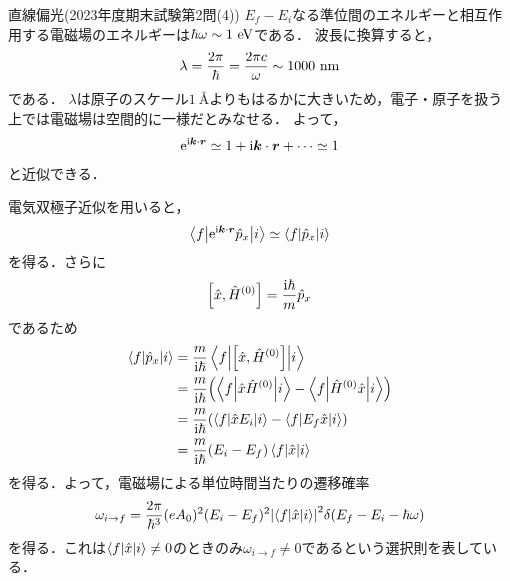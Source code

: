 \documentclass{report}
\begin{document}
\begin{myex}{直線偏光(2023年度期末試験第2問(4))}{}
    $E_f - E_i$なる準位間のエネルギーと相互作用する電磁場のエネルギーは$\hbar \omega\sim 1\ \mathrm{eV}$である．
    波長に換算すると，
    \begin{align}
      \lambda = \frac{2\pi}{\hbar} = \frac{2\pi c}{\omega} \sim 1000\ \r{nm}
    \end{align}
    である．
    $\lambda$は原子のスケール$1\ \si{\angstrom}$よりもはるかに大きいため，電子・原子を扱う上では電磁場は空間的に一様だとみなせる．
    よって，
    \begin{align}
      \mathrm{e}^{\mathrm{i}\bm{k}\cdot\bm{r}}\simeq 1 + \mathrm{i} \bm{k} \cdot \bm{r} + \cdots \simeq 1
    \end{align}
    と近似できる．
    \par
    電気双極子近似を用いると，
    \begin{align}
      \mel**{f}{\mathrm{e}^{\mathrm{i} \bm{k} \cdot \bm{r}}\hat{p}_x}{{i}} \simeq \mel**{f}{\hat{p}_x}{i}
    \end{align}
    を得る．さらに
    \begin{align}
      \qty[\hat{x}, \hat{H}^{(0)}] = \frac{\mathrm{i} \hbar}{m}\hat{p}_x
    \end{align}
    であるため
    \begin{align}
      \mel**{f}{\hat{p}_x}{i} &= \frac{m}{\mathrm{i}\hbar} \mel**{f}{\qty[\hat{x}, \hat{H}^{(0)}]}{i} \\ 
      &= \frac{m}{\mathrm{i}\hbar} \qty(\mel**{f}{\hat{x}\hat{H}^{(0)}}{i} - \mel**{f}{\hat{H}^{(0)}\hat{x}}{i}) \\ 
      &= \frac{m}{\mathrm{i}\hbar} \qty(\mel**{f}{\hat{x}E_i}{i} - \mel**{f}{E_f\hat{x}}{i}) \\ 
      &= \frac{m}{\mathrm{i}\hbar} (E_i - E_f)\mel**{f}{\hat{x}}{i}
    \end{align}
    を得る．よって，電磁場による単位時間当たりの遷移確率
    \begin{align}
      \omega_{i \to f} = \frac{2\pi}{\hbar^3} (eA_0)^2 (E_i - E_f)^2 \abs{\mel**{f}{\hat{x}}{i}}^2 \delta(E_f - E_i - \hbar\omega) 
    \end{align}
    を得る．これは$\mel**{f}{\hat{x}}{i} \neq 0$のときのみ$\omega_{i\to f} \neq 0$であるという選択則を表している．
  \end{myex}
\end{document}
